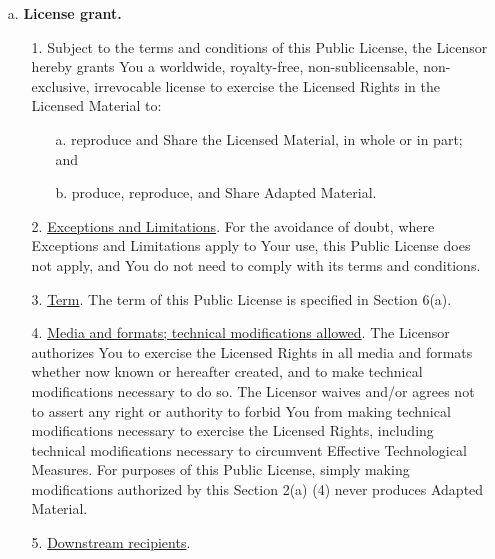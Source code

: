 \begin{enumerate}

	\item[a.] \textbf{License grant.}

	\begin{enumerate}

		\item[1.] Subject to the terms and conditions of this Public License,
		the Licensor hereby grants You a worldwide, royalty-free,
		non-sublicensable, non-exclusive, irrevocable license to
		exercise the Licensed Rights in the Licensed Material to:
		
		\begin{enumerate}

			\item[a.] reproduce and Share the Licensed Material, in whole or
			in part; and

			\item[b.] produce, reproduce, and Share Adapted Material.

		\end{enumerate}

		\item[2.] \underline{Exceptions and Limitations}. For the avoidance of
		doubt, where Exceptions and Limitations apply to Your use, this Public
		License does not apply, and You do not need to comply with
		its terms and conditions.

		\item[3.] \underline{Term}. The term of this Public License is specified
		in Section 6(a).

		\item[4.] \underline{Media and formats; technical modifications allowed}.
		The Licensor authorizes You to exercise the Licensed Rights in
		all media and formats whether now known or hereafter created,
		and to make technical modifications necessary to do so. The
		Licensor waives and/or agrees not to assert any right or
		authority to forbid You from making technical modifications
		necessary to exercise the Licensed Rights, including
		technical modifications necessary to circumvent Effective
		Technological Measures. For purposes of this Public License,
		simply making modifications authorized by this Section 2(a)
		(4) never produces Adapted Material.

		\item[5.] \underline{Downstream recipients}.
		
		\begin{enumerate}


\end{enumerate}
\end{enumerate}
\end{enumerate}
